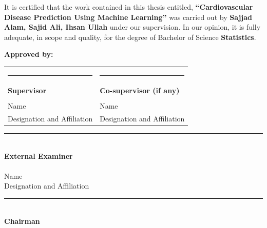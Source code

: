 \documentclass[12pt, a4paper, oneside]{book}
\newcommand{\thesistitle}{Cardiovascular Disease Prediction Using Machine Learning}
\newcommand{\thesisauthorA}{Sajjad Alam}
\newcommand{\thesisauthorB}{Sajid Ali}
\newcommand{\thesisauthorC}{Ihsan Ullah}
\begin{document}
\noindent It is certified that the work contained in this thesis entitled, \textbf{``\thesistitle''} was carried out by \textbf{\thesisauthorA, \thesisauthorB, \thesisauthorC} under our supervision. In our opinion, it is fully adequate, in scope and quality, for the degree of Bachelor of Science \textbf{Statistics}.

\vspace{0.6in}

\noindent \textbf{Approved by:}

\vspace{0.5in}

\noindent
\begin{tabular}{@{}p{}p{}@{}}
\rule{2.2in}{0.4pt} & \rule{2.2in}{0.4pt} \\
\textbf{Supervisor} & \textbf{Co-supervisor (if any)} \\
& \\
Name & Name \\
Designation and Affiliation & Designation and Affiliation
\end{tabular}

\vspace{0.6in}

\noindent \rule{2.2in}{0.4pt}\\
\textbf{External Examiner}\\
\\
Name\\
Designation and Affiliation

\vspace{0.6in}

\noindent \rule{2.2in}{0.4pt}\\
\textbf{Chairman}

\clearpage
\thispagestyle{plain}
\end{document}
